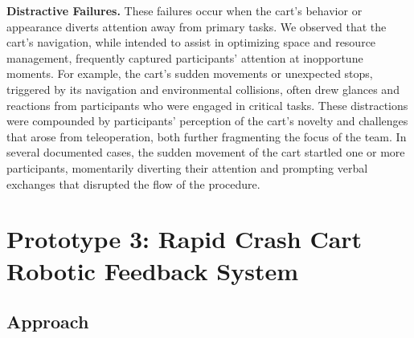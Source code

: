 \textbf{Distractive Failures.} These failures occur when the cart’s behavior or appearance diverts attention away from primary tasks. 
We observed that the cart’s navigation, while intended to assist in optimizing space and resource management, frequently captured participants’ attention at inopportune moments. 
For example, the cart's sudden movements or unexpected stops, triggered by its navigation and environmental collisions, often drew glances and reactions from participants who were engaged in critical tasks. 
These distractions were compounded by participants’ perception of the cart's novelty and challenges that arose from teleoperation, both further fragmenting the focus of the team. 
In several documented cases, the sudden movement of the cart startled one or more participants, momentarily diverting their attention and prompting verbal exchanges that disrupted the flow of the procedure. 


\section{Prototype 3: Rapid Crash Cart Robotic Feedback System}

\subsection{Approach}


